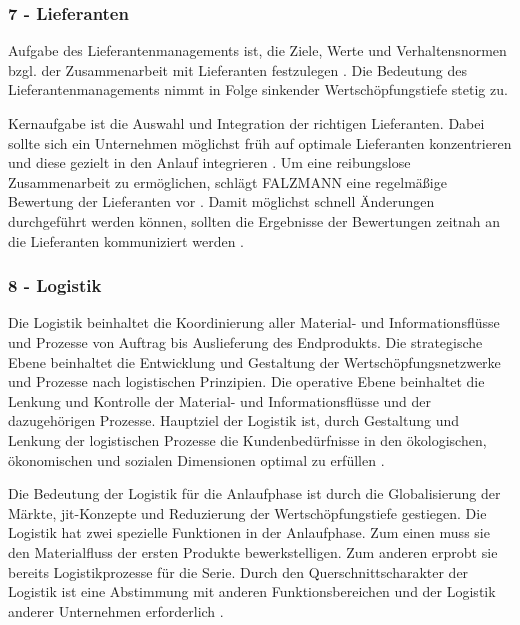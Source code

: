 \subsubsection*{7 - Lieferanten}
Aufgabe des Lieferantenmanagements ist, die Ziele, Werte und Verhaltensnormen bzgl. der Zusammenarbeit mit Lieferanten festzulegen \autocite{Schuh2008}. 
Die Bedeutung des Lieferantenmanagements nimmt in Folge sinkender Wertschöpfungstiefe stetig zu. 

Kernaufgabe ist die Auswahl und Integration der richtigen Lieferanten. Dabei sollte sich ein Unternehmen möglichst früh auf optimale Lieferanten konzentrieren und diese gezielt in den Anlauf integrieren \autocite{Schuh2008}.  
Um eine reibungslose Zusammenarbeit zu ermöglichen, schlägt FALZMANN eine regelmäßige Bewertung der Lieferanten vor \autocite{Falzmann2007}. Damit möglichst schnell Änderungen durchgeführt werden können, sollten die Ergebnisse der Bewertungen zeitnah an die Lieferanten kommuniziert werden \autocite[70]{Hofbauer2016}. 

\subsubsection*{8 - Logistik}

Die Logistik beinhaltet die Koordinierung aller Material- und Informationsflüsse und Prozesse von Auftrag bis Auslieferung des Endprodukts. Die strategische Ebene beinhaltet die Entwicklung und Gestaltung der Wertschöpfungsnetzwerke und Prozesse nach logistischen Prinzipien. Die operative Ebene beinhaltet die Lenkung und Kontrolle der Material- und Informationsflüsse und der dazugehörigen Prozesse. 
Hauptziel der Logistik ist, durch Gestaltung und Lenkung der logistischen Prozesse die Kundenbedürfnisse in den ökologischen, ökonomischen und sozialen Dimensionen optimal zu erfüllen \autocite[28]{Schmitt2015}. 

Die Bedeutung der Logistik für die Anlaufphase ist durch die Globalisierung der Märkte, \gls{jit}-Konzepte und Reduzierung der 
Wertschöpfungstiefe gestiegen. Die Logistik hat zwei spezielle Funktionen in der Anlaufphase. Zum einen muss sie den Materialfluss der ersten Produkte bewerkstelligen. Zum anderen erprobt sie bereits Logistikprozesse für die Serie.
Durch den Querschnittscharakter der Logistik ist eine Abstimmung mit anderen Funktionsbereichen und der Logistik anderer Unternehmen erforderlich \autocite[1189]{Pfohl2000}.

